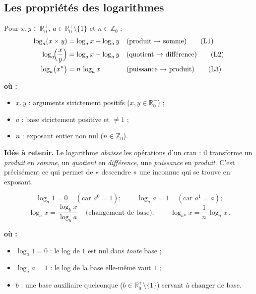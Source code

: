 \documentclass[11pt,a4paper]{article}
\newenvironment{ou}{%
  \par\smallskip\noindent\textbf{où :}\nopagebreak
  \begin{itemize}[leftmargin=1.8em,topsep=2pt,itemsep=1.5pt,parsep=0pt]}%
  {\end{itemize}}
\newcommand{\R}{\mathbb{R}}
\newcommand{\Z}{\mathbb{Z}}
\begin{document}
\subsection{Les propriétés des logarithmes}

\begin{formule}
Pour $x,y\in\R_0^{+}$, $a\in\R_0^{+}\setminus\{1\}$ et $n\in\Z_0$ :
\begin{align}
  \log_a(x\times y) &= \log_a x + \log_a y && \text{(produit $\to$ somme)} \tag{L1}\\
  \log_a\!\Bigl(\frac{x}{y}\Bigr) &= \log_a x - \log_a y && \text{(quotient $\to$ différence)} \tag{L2}\\
  \log_a\bigl(x^{n}\bigr) &= n\,\log_a x && \text{(puissance $\to$ produit)} \tag{L3}
\end{align}
\begin{ou}
  \item $x,y$ : arguments strictement positifs ($x,y\in\R_0^{+}$) ;
  \item $a$ : base strictement positive et $\neq 1$ ;
  \item $n$ : exposant entier non nul ($n\in\Z_0$).
\end{ou}
\end{formule}

\noindent\textbf{Idée à retenir.} Le logarithme \emph{abaisse} les opérations d'un cran : il transforme
un \emph{produit} en \emph{somme}, un \emph{quotient} en \emph{différence}, une \emph{puissance} en
\emph{produit}. C'est précisément ce qui permet de « descendre » une inconnue qui se trouve en exposant.

\begin{formule}
\[ \boxed{\,\log_a 1 = 0\,}\quad(\text{car }a^{0}=1);\qquad
   \boxed{\,\log_a a = 1\,}\quad(\text{car }a^{1}=a); \]
\[ \boxed{\,\log_a x = \frac{\log_b x}{\log_b a}\,}\quad\text{(changement de base)};\qquad
   \boxed{\,\log_{a^{n}} x = \frac{1}{n}\,\log_a x\,}. \]
\begin{ou}
  \item $\log_a 1=0$ : le log de $1$ est nul dans \emph{toute} base ;
  \item $\log_a a=1$ : le log de la base elle-même vaut $1$ ;
  \item $b$ : une base auxiliaire quelconque ($b\in\R_0^{+}\setminus\{1\}$) servant à changer de base.
\end{ou}
\end{formule}
\end{document}
